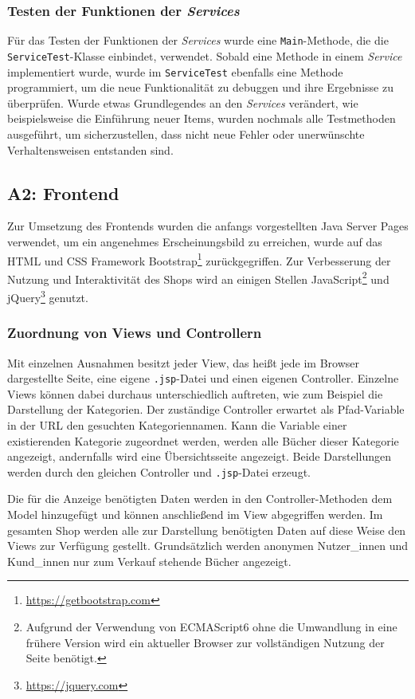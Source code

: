 		\subsubsection{Testen der Funktionen der \textit{Services}}
		Für das Testen der Funktionen der \textit{Services} wurde eine \texttt{Main}-Methode, die die \texttt{Service\-Test}-Klasse einbindet, verwendet. Sobald eine Methode in einem \textit{Service} implementiert wurde, wurde im \texttt{Service\-Test} ebenfalls eine Methode programmiert, um die neue Funktionalität zu debuggen und ihre Ergebnisse zu überprüfen. Wurde etwas Grundlegendes an den \textit{Services} verändert, wie beispielsweise die Einführung neuer Items, wurden nochmals alle Testmethoden ausgeführt, um sicherzustellen, dass nicht neue Fehler oder unerwünschte Verhaltensweisen entstanden sind.
		
	\subsection{A2: Frontend}
	Zur Umsetzung des Frontends wurden die anfangs vorgestellten Java Server Pages verwendet, um ein angenehmes Erscheinungsbild zu erreichen, wurde auf das HTML und CSS Framework Bootstrap\footnote{\hyperlink{https://getbootstrap.com}{https://getbootstrap.com}} zurückgegriffen. Zur Verbesserung der Nutzung und Interaktivität des Shops wird an einigen Stellen JavaScript\footnote{Aufgrund der Verwendung von ECMAScript6 ohne die Umwandlung in eine frühere Version wird ein aktueller Browser zur vollständigen Nutzung der Seite benötigt.} und jQuery\footnote{\hyperlink{https://jquery.com}{https://jquery.com}} genutzt.
	
		\subsubsection{Zuordnung von Views und Controllern}	
		Mit einzelnen Ausnahmen besitzt jeder View, das heißt jede im Browser dargestellte Seite, eine eigene \lstinline|.jsp|-Datei und einen eigenen Controller. Einzelne Views können dabei durchaus unterschiedlich auftreten, wie zum Beispiel die Darstellung der Kategorien. Der zuständige Controller erwartet als Pfad-Variable in der URL den gesuchten Kategoriennamen. Kann die Variable einer existierenden Kategorie zugeordnet werden, werden alle Bücher dieser Kategorie angezeigt, andernfalls wird eine Übersichtsseite angezeigt. Beide Darstellungen werden durch den gleichen Controller und \lstinline|.jsp|-Datei erzeugt.
		
		Die für die Anzeige benötigten Daten werden in den Controller-Methoden dem Model hinzugefügt und können anschließend im View abgegriffen werden. Im gesamten Shop werden alle zur Darstellung benötigten Daten auf diese Weise den Views zur Verfügung gestellt. Grundsätzlich werden anonymen Nutzer\_innen und Kund\_innen nur zum Verkauf stehende Bücher angezeigt.
		

